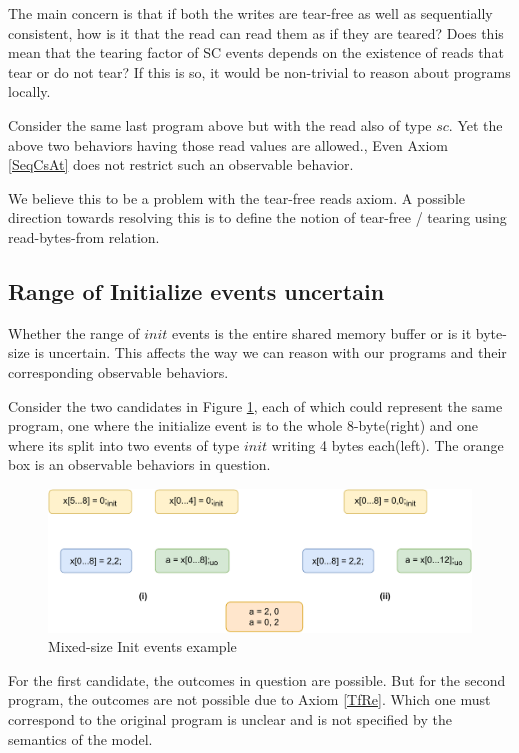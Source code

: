         The main concern is that if both the writes are tear-free as well as sequentially consistent, how is it that the read can read them as if they are teared?
        Does this mean that the tearing factor of SC events depends on the existence of reads that tear or do not tear? 
        If this is so, it would be non-trivial to reason about programs locally.
       
        Consider the same last program above but with the read also of type $sc$. 
        Yet the above two behaviors having those read values are allowed.,
        Even Axiom \ref{SeqCsAt} does not restrict such an observable behavior.

        We believe this to be a problem with the tear-free reads axiom.
        A possible direction towards resolving this is to define the notion of tear-free / tearing using read-bytes-from relation. 

    \subsection{Range of Initialize events uncertain}

        Whether the range of $init$ events is the entire shared memory buffer or is it byte-size is uncertain.
        This affects the way we can reason with our programs and their corresponding observable behaviors.

        Consider the two candidates in Figure \ref{crit:range}, each of which could represent the same program, one where the initialize event is to the whole 8-byte(right) and one where its split into two events of type $init$ writing 4 bytes each(left).
        The orange box is an observable behaviors in question.
        \begin{figure}[H]
            \centering
            \includegraphics[scale=0.7]{7.ConclusionFutureWork/InitExample.pdf}
            \caption{Mixed-size Init events example}
            \label{crit:range}
        \end{figure}

        For the first candidate, the outcomes in question are possible.
        But for the second program, the outcomes are not possible due to Axiom \ref{TfRe}.
        Which one must correspond to the original program is unclear and is not specified by the semantics of the model.

